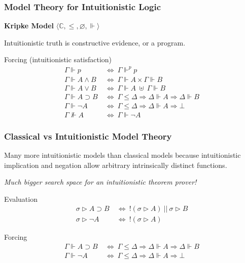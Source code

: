 \documentclass[mathserif]{beamer}
\def\imp{\supset}
\def\dfn{~\Leftrightarrow~}
\def\arr{\Rightarrow}
\newcommand{\eval}[1]{\sigma \triangleright #1}
\newcommand{\force}[1]{\Gamma \Vdash #1}
\newcommand{\dforce}[1]{\Delta \Vdash #1}
\newcommand{\forcep}[1]{\Gamma \Vdash^p #1}
\newcommand{\nforce}[1]{\Gamma \nVdash #1}
\begin{document}
\begin{frame}
\frametitle{Model Theory for Intuitionistic Logic}

{\bf Kripke Model} $\langle \mathbb{C} , \leq , \varnothing , \Vdash \rangle$

Intuitionistic truth is constructive evidence, or a program.


\begin{block}{Forcing (intuitionistic satisfaction)}
\begin{align*}
\force{p} &\dfn \forcep{p}\\
\force{A \land B} &\dfn \force{A} \times \force{B}\\
\force{A \lor B} &\dfn \force{A} ~\uplus~ \force{B}\\
\force{A \imp B} &\dfn \Gamma \leq \Delta \arr \dforce{A} \arr \dforce{B}\\
\force{\neg A} &\dfn \Gamma \leq \Delta \arr \dforce{A} \arr \bot\\
\nforce{A} &\dfn \force{\neg A}
\end{align*}
\end{block}

\end{frame}

\begin{frame}
\frametitle{Classical vs Intuitionistic Model Theory}

Many more intuitionistic models than classical models
because intuitionistic implication and negation allow 
arbitrary intrinsically distinct functions.

{\it Much bigger search space for an intuitionistic theorem prover!}

\begin{block}{Evaluation}
\begin{align*}
\eval{A \imp B} &\dfn ! (\eval{A}) ~||~ \eval{B}\\
\eval{\neg A} &\dfn ! (\eval{A})
\end{align*}
\end{block}

\begin{block}{Forcing}
\begin{align*}
\force{A \imp B} &\dfn \Gamma \leq \Delta \arr \dforce{A} \arr \dforce{B}\\
\force{\neg A} &\dfn \Gamma \leq \Delta \arr \dforce{A} \arr \bot
\end{align*}
\end{block}


\end{frame}
\end{document}
